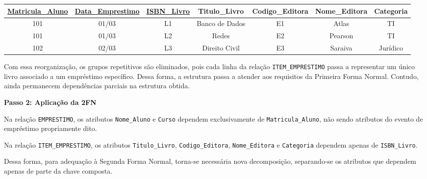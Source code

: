 \vspace{0.3cm}

\vspace{0.5cm}

\begin{adjustbox}{max width=\textwidth}
\begin{tabular}{|c|c|c|c|c|c|c|}
\hline
\textbf{\underline{Matricula\_Aluno}} & \textbf{\underline{Data\_Emprestimo}} & \textbf{\underline{ISBN\_Livro}} & Titulo\_Livro & Codigo\_Editora & Nome\_Editora & Categoria \\ \hline
101 & 01/03 & L1 & Banco de Dados & E1 & Atlas & TI \\ \hline
101 & 01/03 & L2 & Redes & E2 & Pearson & TI \\ \hline
102 & 02/03 & L3 & Direito Civil & E3 & Saraiva & Jurídico \\ \hline
\end{tabular}
\end{adjustbox}

\vspace{0.3cm}

\vspace{0.4cm}

\justify

Com essa reorganização, os grupos repetitivos são eliminados, pois cada linha da relação \texttt{ITEM\_EMPRESTIMO} passa a representar um único livro associado a um empréstimo específico. Dessa forma, a estrutura passa a atender aos requisitos da Primeira Forma Normal. Contudo, ainda permanecem dependências parciais na estrutura obtida.

\vspace{0.4cm}

\textbf{Passo 2: Aplicação da 2FN}

Na relação \texttt{EMPRESTIMO}, os atributos \texttt{Nome\_Aluno} e \texttt{Curso} dependem exclusivamente de \texttt{Matricula\_Aluno}, não sendo atributos do evento de empréstimo propriamente dito.

Na relação \texttt{ITEM\_EMPRESTIMO}, os atributos \texttt{Titulo\_Livro}, \texttt{Codigo\_Editora}, \texttt{Nome\_Editora} e \texttt{Categoria} dependem apenas de \texttt{ISBN\_Livro}.

Dessa forma, para adequação à Segunda Forma Normal, torna-se necessária nova decomposição, separando-se os atributos que dependem apenas de parte da chave composta.

